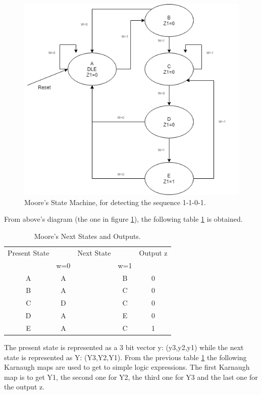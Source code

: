 \begin{figure}[H]
\centering
\includegraphics[scale=0.5]{../Exercise2/EJ2MOORE}
\caption{\color{cyan}Moore's State Machine, for detecting the sequence 1-1-0-1.}
\label{MOOREFSM}
\end{figure}

From above's diagram (the one in figure \ref {MOOREFSM}), the following table \ref {measej1} is obtained. 
\begin{table}[H]
\begin{center}
\begin{tabular}{|c|c c c|c|}
\hline
Present State & & Next State & & Output z \\
 & w=0 & & w=1 &   \\
\hline
\hline
A & A & & B & 0   \\
\hline
B & A & & C & 0   \\
\hline
C & D & & C & 0   \\
\hline
D & A & & E & 0   \\
\hline
E & A & & C & 1   \\
\hline
\hline
\end{tabular}
\end{center}
\caption{\label{measej1}\color{cyan}Moore's Next States and Outputs.}
\end{table}

The present state is represented as a 3 bit vector y: (y3,y2,y1) while the next state is represented as Y: (Y3,Y2,Y1). From the previous table \ref {measej1} the following Karnaugh maps are used to get to simple logic expressions. The first Karnaugh map is to get Y1, the second one for Y2, the third one for Y3 and the last one for the output z.

